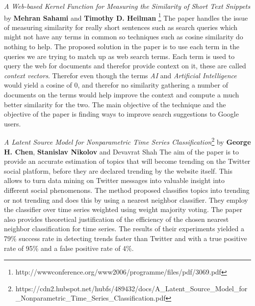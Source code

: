 \textit{A Web-based Kernel Function for Measuring the Similarity of Short Text Snippets} by \textbf{Mehran Sahami} and \textbf{Timothy D. Heilman} \footnote{http://wwwconference.org/www2006/programme/files/pdf/3069.pdf}
\newline
\newline
The paper handles the issue of measuring similarity for really short sentences such as search queries which might not have any terms in common so techniques such as cosine similarity do nothing to help. The proposed solution in the paper is to use each term in the queries we are trying to match up as web search terms. Each term is used to query the web for documents and therefor provide context on it, these are called \textit{context vectors}. Therefor even though the terms \textit{AI} and \textit{Artificial Intelligence} would yield a cosine of 0, and therefor no similarity gathering a number of documents on the terms would help improve the context and compute a much better similarity for the two.
\newline
The main objective of the technique and the objective of the paper is finding ways to improve search suggestions to Google users.

\textit{A Latent Source Model for Nonparametric Time Series Classification}\footnote{https://cdn2.hubspot.net/hubfs/489432/docs/A_Latent_Source_Model_for_Nonparametric_Time_Series_Classification.pdf} by \textbf{George H. Chen}, \textbf{Stanislav Nikolov} and {Devavrat Shah}
\newline
\newline
The aim of the paper is to provide an accurate estimation of topics that will become trending on the Twitter social platform, before they are declared trending by the website itself. This allows to turn data mining on Twitter messages into valuable insight into different social phenomenons.
\newline
The method proposed classifies topics into trending or not trending and does this by using a nearest neighbor classifier. They employ the classifier over time series weighted using weight majority voting.
\newline
The paper also provides theoretical justification of the efficiency of the chosen nearest neighbor classification for time series.
\newline
The results of their experiments yielded a 79\% success rate in detecting trends faster than Twitter and with a true positive rate of 95\% and a false positive rate of 4\%.